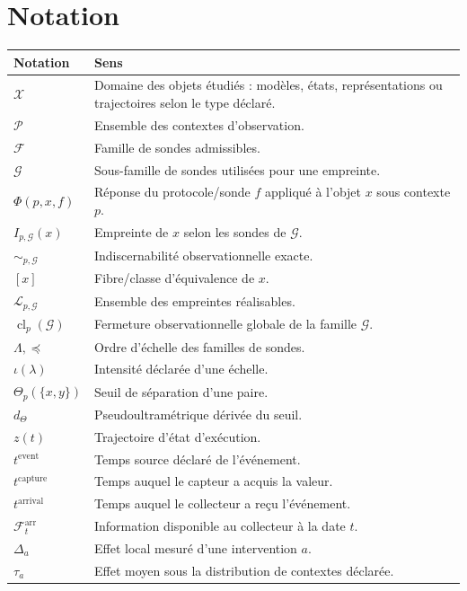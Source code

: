 \documentclass[11pt,oneside]{book}
\theoremstyle{definition}
\theoremstyle{remark}
\newcommand{\X}{\mathcal X}
\newcommand{\Pcal}{\mathcal P}
\newcommand{\Fcal}{\mathcal F}
\newcommand{\Gcal}{\mathcal G}
\newcommand{\Lcal}{\mathcal L}
\newcommand{\1}{\mathbf 1}
\newcommand{\cl}{\operatorname{cl}}
\begin{document}
\section*{Notation}
\begin{longtable}{p{}p{}}
\toprule
\textbf{Notation} & \textbf{Sens}\\
\midrule
\endhead
$\X$ & Domaine des objets étudiés : modèles, états, représentations ou trajectoires selon le type déclaré.\\
$\Pcal$ & Ensemble des contextes d'observation.\\
$\Fcal$ & Famille de sondes admissibles.\\
$\Gcal$ & Sous-famille de sondes utilisées pour une empreinte.\\
$\Phi(p,x,f)$ & Réponse du protocole/sonde $f$ appliqué à l'objet $x$ sous contexte $p$.\\
$I_{p,\Gcal}(x)$ & Empreinte de $x$ selon les sondes de $\Gcal$.\\
$\sim_{p,\Gcal}$ & Indiscernabilité observationnelle exacte.\\
$[x]$ & Fibre/classe d'équivalence de $x$.\\
$\Lcal_{p,\Gcal}$ & Ensemble des empreintes réalisables.\\
$\cl_p(\Gcal)$ & Fermeture observationnelle globale de la famille $\Gcal$.\\
$\Lambda,\preceq$ & Ordre d'échelle des familles de sondes.\\
$\iota(\lambda)$ & Intensité déclarée d'une échelle.\\
$\Theta_p(\{x,y\})$ & Seuil de séparation d'une paire.\\
$d_\Theta$ & Pseudoultramétrique dérivée du seuil.\\
$z(t)$ & Trajectoire d'état d'exécution.\\
$t^{\mathrm{event}}$ & Temps source déclaré de l'événement.\\
$t^{\mathrm{capture}}$ & Temps auquel le capteur a acquis la valeur.\\
$t^{\mathrm{arrival}}$ & Temps auquel le collecteur a reçu l'événement.\\
$\Fcal_t^{\mathrm{arr}}$ & Information disponible au collecteur à la date $t$.\\
$\Delta_a$ & Effet local mesuré d'une intervention $a$.\\
$\tau_a$ & Effet moyen sous la distribution de contextes déclarée.\\
\bottomrule
\end{longtable}
\end{document}
